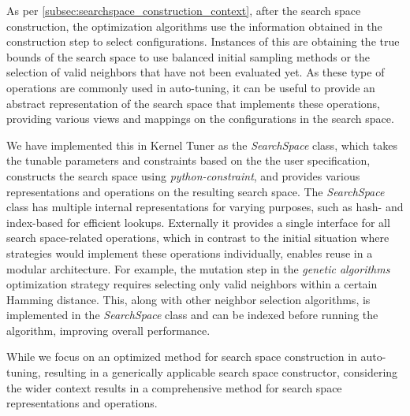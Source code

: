 As per \cref{subsec:searchspace_construction_context}, after the search space construction, the optimization algorithms use the information obtained in the construction step to select configurations.
Instances of this are obtaining the true bounds of the search space to use balanced initial sampling methods or the selection of valid neighbors that have not been evaluated yet. 
As these type of operations are commonly used in auto-tuning, it can be useful to provide an abstract representation of the search space that implements these operations, providing various views and mappings on the configurations in the search space. 

We have implemented this in Kernel Tuner as the \textit{SearchSpace} class, which takes the tunable parameters and constraints based on the the user specification, constructs the search space using \textit{python-constraint}, and provides various representations and operations on the resulting search space.  
The \textit{SearchSpace} class has multiple internal representations for varying purposes, such as hash- and index-based for efficient lookups. Externally it provides a single interface for all search space-related operations, which in contrast to the initial situation where strategies would implement these operations individually, enables reuse in a modular architecture. 
For example, the mutation step in the \textit{genetic algorithms} optimization strategy requires selecting only valid neighbors within a certain Hamming distance. This, along with other neighbor selection algorithms, is implemented in the \textit{SearchSpace} class and can be indexed before running the algorithm, improving overall performance. 

While we focus on an optimized method for search space construction in auto-tuning, resulting in a generically applicable search space constructor, considering the wider context results in a comprehensive method for search space representations and operations. 


